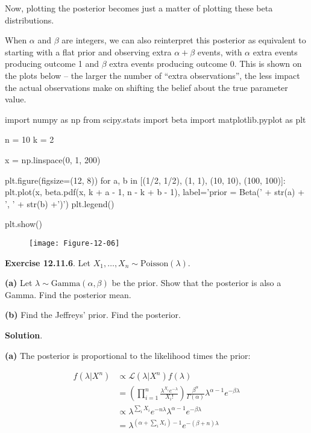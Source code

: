 Now, plotting the posterior becomes just a matter of plotting these beta
distributions.

When \(\alpha\) and \(\beta\) are integers, we can also reinterpret this
posterior as equivalent to starting with a flat prior and observing
extra \(\alpha + \beta\) events, with \(\alpha\) extra events producing
outcome 1 and \(\beta\) extra events producing outcome 0. This is shown
on the plots below -- the larger the number of ``extra observations'',
the less impact the actual observations make on shifting the belief
about the true parameter value.

\begin{python}
import numpy as np
from scipy.stats import beta
import matplotlib.pyplot as plt

n = 10
k = 2

x = np.linspace(0, 1, 200)

plt.figure(figsize=(12, 8))
for a, b in [(1/2, 1/2), (1, 1), (10, 10), (100, 100)]:
    plt.plot(x, beta.pdf(x, k + a - 1, n - k + b - 1), label='prior = Beta(' + str(a) + ', ' + str(b) +')')
    plt.legend()

plt.show()
\end{python}

\begin{figure}[H]
\texttt{[image: Figure-12-06]}
\end{figure}
    
\textbf{Exercise 12.11.6}. Let
\(X_1, \dots, X_n \sim \text{Poisson}(\lambda)\).

\textbf{(a)} Let \(\lambda \sim \text{Gamma}(\alpha, \beta)\) be the
prior. Show that the posterior is also a Gamma. Find the posterior mean.

\textbf{(b)} Find the Jeffreys' prior. Find the posterior.

\textbf{Solution}.

\textbf{(a)} The posterior is proportional to the likelihood times the
prior:

\begin{align}
f(\lambda | X^n) &\propto \mathcal{L}(\lambda | X^n) f(\lambda) \\
&= \left(\prod_{i=1}^n \frac{\lambda^{X_i}e^{-\lambda}}{X_i!} \right) \frac{\beta^{\alpha}}{\Gamma(\alpha)}\lambda^{\alpha - 1}e^{-\beta \lambda} \\
& \propto \lambda^{\sum_i X_i} e^{-n\lambda} \lambda^{\alpha - 1}e^{-\beta \lambda} \\
&= \lambda^{\left(\alpha + \sum_i X_i \right) - 1} e^{-(\beta + n) \lambda}
\end{align}

